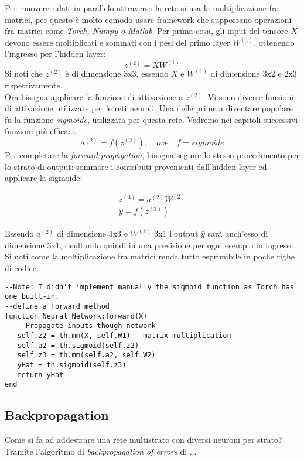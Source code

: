 Per muovere i dati in parallelo attraverso la rete si usa la moltiplicazione fra matrici, per questo è molto comodo usare framework che supportano operazioni fra matrici come \emph{Torch, Numpy o Matlab}. Per prima cosa, gli input del tensore $X$ devono essere moltiplicati e sommati con i pesi del primo layer $W^{(1)}$, ottenendo l'ingresso per l'hidden layer: 
\begin{equation}
z^{(2)} = XW^{(1)} \tag{1}
\end{equation}
Si noti che $z^{(2)}$ è di dimensione 3x3, essendo $X$ e $W^{(1)}$ di dimensione 3x2 e 2x3 rispettivamente. \\
Ora bisogna applicare la funzione di attivazione a $z^{(2)}$. Vi sono diverse funzioni di attivazione utilizzate per le reti neurali. Una delle prime a diventare popolare fu la funzione \emph{sigmoide}\parencite{WSigmoid}, utilizzata per questa rete. Vedremo nei capitoli successivi funzioni più efficaci.
\begin{equation}
a^{(2)} = f(z^{(2)}) \tag{2},\quad ove \quad f=sigmoide
\end{equation}
Per completare la \emph{forward propagation}, bisogna seguire lo stesso procedimento per lo strato di output: sommare i contributi provenienti dall'hidden layer ed applicare la sigmoide: 
\begin{center}
\begin{align*}
z^{(3)} = a^{(2)}W^{(2)} \tag{3}\\
\hat{y} = f(z^{(3)}) \tag{4}
\end{align*}
\end{center}
Essendo $a^{(2)}$ di dimensione 3x3 e $W^{(2)}$ 3x1 l'output $\hat{y}$ sarà anch'esso di dimensione 3x1, risultando quindi in una previsione per ogni esempio in ingresso. \\
Si noti come la moltiplicazione fra matrici renda tutto esprimibile in poche righe di codice. 
\begin{lstlisting}[language={[5.2]Lua}]
--Note: I didn't implement manually the sigmoid function as Torch has one built-in.
--define a forward method
function Neural_Network:forward(X)
   --Propagate inputs though network
   self.z2 = th.mm(X, self.W1) --matrix multiplication
   self.a2 = th.sigmoid(self.z2)
   self.z3 = th.mm(self.a2, self.W2)
   yHat = th.sigmoid(self.z3)
   return yHat
end
\end{lstlisting}
\subsection{Backpropagation}
Come si fa ad addestrare una rete multistrato con diversi neuroni per strato? Tramite l'algoritmo di \emph{backpropagation of errors} di ... 
